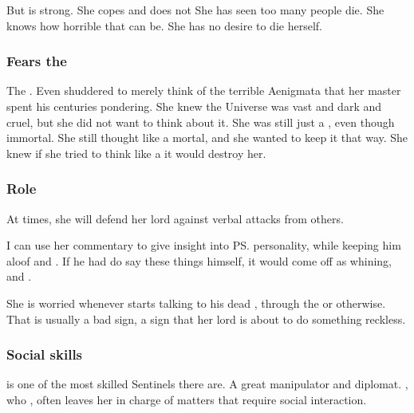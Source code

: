 But \Criseis{} is strong. 
She copes and does not 
She has seen too many people die. 
She knows how horrible that can be. 
She has no desire to die herself. 





\subsubsection{Fears the \dragons}
The \dragons {}. 
Even \Criseis shuddered to merely think of the terrible Aenigmata that her master spent his centuries pondering.
She knew the Universe was vast and dark and cruel, but she did not want to think about it.
She was still just a \scatha, even though immortal.
She still thought like a mortal, and she wanted to keep it that way.
She knew if she tried to think like a \dragon it would destroy her.





\subsubsection{Role}
At times, she will defend her lord against verbal attacks from others.  

I can use her commentary to give insight into \ps{\Ishnaruchaefir} personality, while keeping him aloof and . If he had do say these things himself, it would come off as whining,  and . 

She is worried whenever \Ishnaruchaefir{} starts talking to his dead \Triestessakhin, through the  or otherwise. That is usually a bad sign, a sign that her lord is about to do something reckless. 





\subsubsection{Social skills}
\Criseis{} is one of the most skilled Sentinels there are. 
A great manipulator and diplomat. 
\Ishnaruchaefir, who , often leaves her in charge of matters that require social interaction. 





